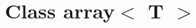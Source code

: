 \documentclass{manual}
\begin{document}
%



%

        \chapter{Class array$<$ T $>$}
        
\end{document}
